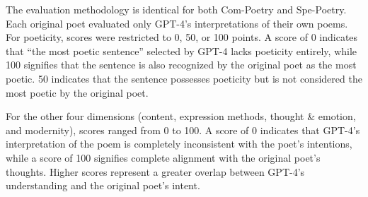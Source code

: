 \documentclass[11pt]{article}
\begin{document}
The evaluation methodology is identical for both Com-Poetry and Spe-Poetry. Each original poet evaluated only GPT-4’s interpretations of their own poems. For poeticity, scores were restricted to 0, 50, or 100 points. A score of 0 indicates that ``the most poetic sentence'' selected by GPT-4 lacks poeticity entirely, while 100 signifies that the sentence is also recognized by the original poet as the most poetic. 50 indicates that the sentence possesses poeticity but is not considered the most poetic by the original poet.





For the other four dimensions (content, expression methods, thought \& emotion, and modernity), scores ranged from 0 to 100. A score of 0 indicates that GPT-4’s interpretation of the poem is completely inconsistent with the poet’s intentions, while a score of 100 signifies complete alignment with the original poet’s thoughts. Higher scores represent a greater overlap between GPT-4’s understanding and the original poet’s intent.



\end{document}
